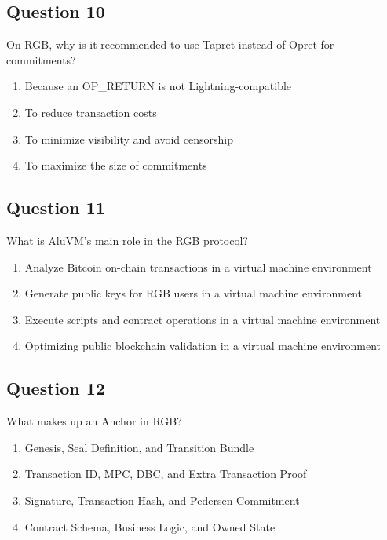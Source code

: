 \documentclass[12pt,a4paper]{article}
\begin{document}
\bigskip


\subsection*{Question 10}
On RGB, why is it recommended to use Tapret instead of Opret for commitments?

\begin{enumerate}[label=\Alph*., leftmargin=*]
\item Because an OP\_RETURN is not Lightning-compatible
\item To reduce transaction costs
\item To minimize visibility and avoid censorship
\item To maximize the size of commitments
\end{enumerate}

\bigskip


\subsection*{Question 11}
What is AluVM's main role in the RGB protocol?

\begin{enumerate}[label=\Alph*., leftmargin=*]
\item Analyze Bitcoin on-chain transactions in a virtual machine environment
\item Generate public keys for RGB users in a virtual machine environment
\item Execute scripts and contract operations in a virtual machine environment
\item Optimizing public blockchain validation in a virtual machine environment
\end{enumerate}

\bigskip


\subsection*{Question 12}
What makes up an Anchor in RGB?

\begin{enumerate}[label=\Alph*., leftmargin=*]
\item Genesis, Seal Definition, and Transition Bundle
\item Transaction ID, MPC, DBC, and Extra Transaction Proof
\item Signature, Transaction Hash, and Pedersen Commitment
\item Contract Schema, Business Logic, and Owned State
\end{enumerate}
\end{document}
